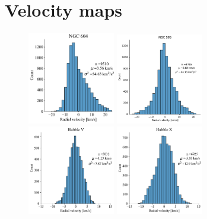 \documentclass[fleqn,usenatbib, useAMS, a4paper]{mnras}
\begin{document}

\appendix

\section{Velocity maps}\label{sec:VelMaps}

\begin{figure}
\centering
\begin{multicols}{4}
\includegraphics[width=1.5in]{Figures/Hist/604}\par
\includegraphics[width=1.5in]{Figures/Hist/595.pdf}\par
\includegraphics[width=1.5in]{Figures/Hist/Hubble V.pdf}\par
\includegraphics[width=1.5in]{Figures/Hist/Hubble X.pdf}\par

\end{multicols}
\end{figure}
\end{document}
